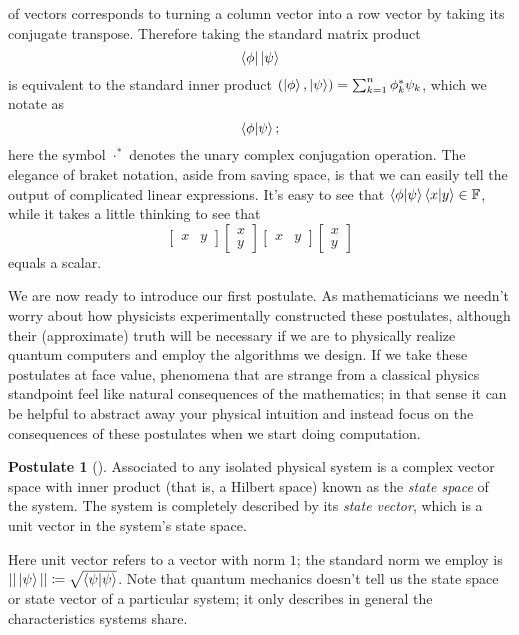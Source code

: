 \documentclass[12pt,twoside]{reedthesis}
\theoremstyle{plain}   %
\theoremstyle{definition}
\newtheorem{post}{Postulate}[section]
\theoremstyle{remark}
\numberwithin{equation}{section}
\begin{document}
  of vectors corresponds to turning a column vector into a row vector by taking its conjugate transpose. Therefore taking the standard matrix product
  \[\bra{\phi} \ket{\psi}\]
  is equivalent to the standard inner product $(\ket{\phi}, \ket{\psi}) = \sum_{k=1}^n \phi_k^* \psi_k$, which we notate as
  \[\braket{\phi | \psi};\]
  here the symbol $\cdot^*$ denotes the unary complex conjugation operation.
  The elegance of braket notation, aside from saving space, is that we can easily tell the output of complicated linear expressions.
  It's easy to see that $\braket{\phi | \psi} \braket{x | y} \in \mathbb{F}$, while it takes a little thinking to see that
  \[
    \begin{bmatrix}
      x & y
    \end{bmatrix}
    \begin{bmatrix}
      x \\ y
    \end{bmatrix}
    \begin{bmatrix}
      x & y
    \end{bmatrix}
    \begin{bmatrix}
      x \\ y
    \end{bmatrix}
  \]
  equals a scalar.
  \par
  We are now ready to introduce our first postulate. As mathematicians we needn't worry about how physicists experimentally constructed these postulates, although their
  (approximate) truth will be necessary if we are to physically realize quantum computers and employ the algorithms we design.
  If we take these postulates at face value, phenomena that are strange from a classical physics standpoint feel like natural consequences of the mathematics;
  in that sense it can be helpful to abstract away your physical intuition and instead focus on the consequences of these postulates when we start doing computation.
  \begin{post}[{\cite[2.2.1]{nielsen2010}}]
    Associated to any isolated physical system is a complex vector space
    with inner product (that is, a Hilbert space) known as the \emph{state space} of the
    system. The system is completely described by its \emph{state vector}, which is a unit
    vector in the system's state space.
  \end{post}
  Here unit vector refers to a vector with norm $1$; the standard norm we employ is $|| \ket{\psi} || \coloneq \sqrt{\braket{\psi| \psi}}$.
  Note that quantum mechanics doesn't tell us the state space or state vector of a particular system; it only describes in general the characteristics systems share.
\end{document}
